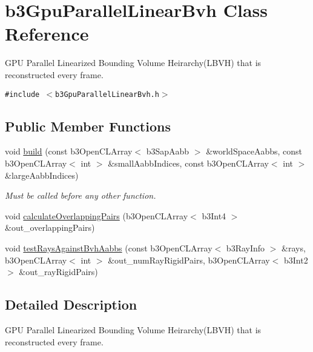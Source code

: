 \hypertarget{classb3_gpu_parallel_linear_bvh}{
\section{b3GpuParallelLinearBvh Class Reference}
\label{classb3_gpu_parallel_linear_bvh}
}
GPU Parallel Linearized Bounding Volume Heirarchy(LBVH) that is reconstructed every frame.  


{\tt \#include $<$b3GpuParallelLinearBvh.h$>$}

\subsection*{Public Member Functions}
\begin{CompactItemize}
\item 
\hypertarget{classb3_gpu_parallel_linear_bvh_c6e619d22cc2bd9c979900cf83d59143}{
void \hyperlink{classb3_gpu_parallel_linear_bvh_c6e619d22cc2bd9c979900cf83d59143}{build} (const b3OpenCLArray$<$ b3SapAabb $>$ \&worldSpaceAabbs, const b3OpenCLArray$<$ int $>$ \&smallAabbIndices, const b3OpenCLArray$<$ int $>$ \&largeAabbIndices)}
\label{classb3_gpu_parallel_linear_bvh_c6e619d22cc2bd9c979900cf83d59143}

\begin{CompactList}\small\item\em Must be called before any other function. \item\end{CompactList}\item 
void \hyperlink{classb3_gpu_parallel_linear_bvh_c0208fca9279bdfd66eabd321d98420b}{calculateOverlappingPairs} (b3OpenCLArray$<$ b3Int4 $>$ \&out\_\-overlappingPairs)
\item 
void \hyperlink{classb3_gpu_parallel_linear_bvh_a2e73543c39fe8a8ba65394fbc33e8bb}{testRaysAgainstBvhAabbs} (const b3OpenCLArray$<$ b3RayInfo $>$ \&rays, b3OpenCLArray$<$ int $>$ \&out\_\-numRayRigidPairs, b3OpenCLArray$<$ b3Int2 $>$ \&out\_\-rayRigidPairs)
\end{CompactItemize}


\subsection{Detailed Description}
GPU Parallel Linearized Bounding Volume Heirarchy(LBVH) that is reconstructed every frame. 

